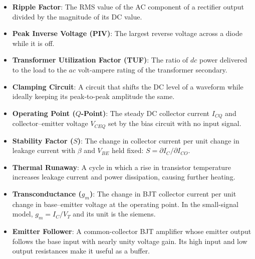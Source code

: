 \documentclass[12pt,a4paper]{article}
\begin{document}
\begin{tcolorbox}[defbox, title={One-Line Definitions}, title after break={One-Line Definitions (contd.)}]
\small
{}
\begin{itemize}[leftmargin=1.5em, topsep=2pt, itemsep=4pt]
  \item \textbf{Ripple Factor}: The RMS value of the AC component of a rectifier output divided by the magnitude of its DC value.
  \item \textbf{Peak Inverse Voltage (PIV)}: The largest reverse voltage across a diode while it is off.
  \item \textbf{Transformer Utilization Factor (TUF)}: The ratio of $dc$ power delivered to the load to the $ac$ volt-ampere rating of the transformer secondary.
  \item \textbf{Clamping Circuit}: A circuit that shifts the DC level of a waveform while ideally keeping its peak-to-peak amplitude the same.
  \item \textbf{Operating Point ($Q$-Point)}: The steady DC collector current $I_{CQ}$ and collector--emitter voltage $V_{CEQ}$ set by the bias circuit with no input signal.
  \item \textbf{Stability Factor ($S$)}: The change in collector current per unit change in leakage current with $\beta$ and $V_{BE}$ held fixed: $S=\partial I_C/\partial I_{CO}$.
  \item \textbf{Thermal Runaway}: A cycle in which a rise in transistor temperature increases leakage current and power dissipation, causing further heating.
  \item \textbf{Transconductance ($g_m$)}: The change in BJT collector current per unit change in base--emitter voltage at the operating point. In the small-signal model, $g_m=I_C/V_T$ and its unit is the siemens.
  \item \textbf{Emitter Follower}: A common-collector BJT amplifier whose emitter output follows the base input with nearly unity voltage gain. Its high input and low output resistances make it useful as a buffer.
\end{itemize}
\end{tcolorbox}
\end{document}
